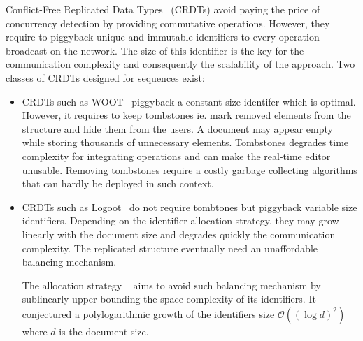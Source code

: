 Conflict-Free Replicated Data Types~\cite{shapiro2011comprehensive}
(CRDTs) avoid paying the price of concurrency detection by providing
commutative operations. However, they require to piggyback unique and
immutable identifiers to every operation broadcast on the network. The
size of this identifier is the key for the communication complexity
and consequently the scalability of the approach. Two classes of CRDTs
designed for sequences exist:
\begin{itemize}
\item CRDTs such as WOOT~\cite{oster2006data} piggyback a
  constant-size identifer which is optimal. However, it requires to
  keep tombstones ie. mark removed elements from the structure and
  hide them from the users. A document may appear empty while storing
  thousands of unnecessary elements. Tombstones degrades time
  complexity for integrating operations and can make the real-time editor
  unusable. Removing tombstones require a costly garbage collecting
  algorithms that can hardly be deployed in such context.
\item CRDTs such as Logoot~\cite{weiss2010logootundo} do not require tombtones but
  piggyback variable size identifiers. Depending on the identifier
  allocation strategy, they may grow linearly with the document
  size and degrades quickly the communication complexity. The
  replicated structure eventually need an unaffordable balancing
  mechanism.

  The allocation strategy \LSEQ~\cite{nedelec2013concurrency} aims to
  avoid such balancing mechanism by sublinearly upper-bounding the
  space complexity of its identifiers. It conjectured a
  polylogarithmic growth of the identifiers size
  $\mathcal{O}((\log d)^2)$ where $d$ is the document
  size. %
\end{itemize}


